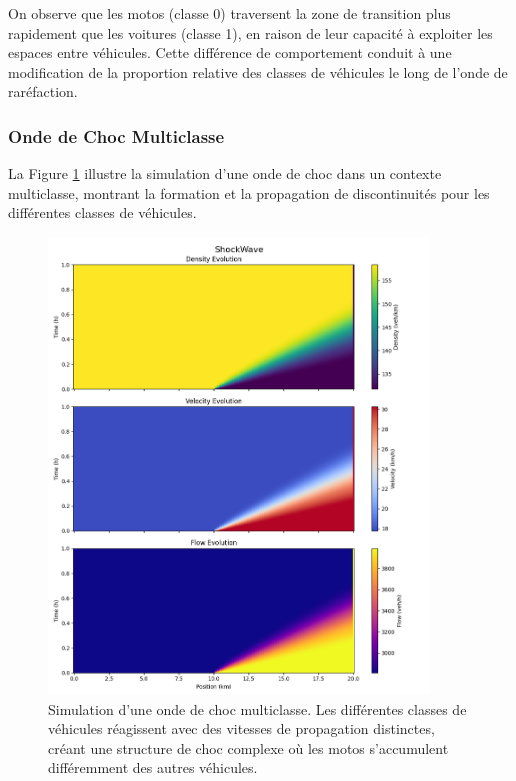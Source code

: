 On observe que les motos (classe 0) traversent la zone de transition plus rapidement que les voitures (classe 1), en raison de leur capacité à exploiter les espaces entre véhicules. Cette différence de comportement conduit à une modification de la proportion relative des classes de véhicules le long de l'onde de raréfaction.

\subsubsection{Onde de Choc Multiclasse}
\label{subsubsec:choc_multiclasse}

La Figure \ref{fig:choc_multiclasse} illustre la simulation d'une onde de choc dans un contexte multiclasse, montrant la formation et la propagation de discontinuités pour les différentes classes de véhicules.

\begin{figure}[htbp]
\centering
\includegraphics[width=0.9\textwidth]{simulations/MULTICLASS/shock/shockwave.png}
\caption{Simulation d'une onde de choc multiclasse. Les différentes classes de véhicules réagissent avec des vitesses de propagation distinctes, créant une structure de choc complexe où les motos s'accumulent différemment des autres véhicules.}
\label{fig:choc_multiclasse}
\end{figure}

